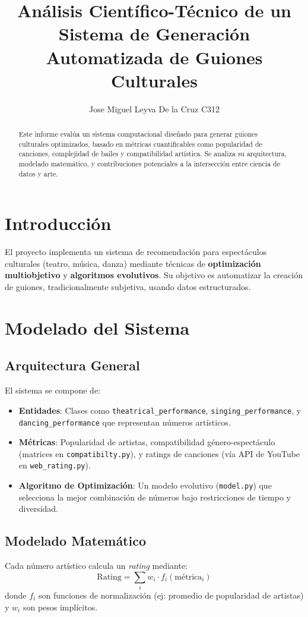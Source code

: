 \documentclass{article}
\title{Análisis Científico-Técnico de un Sistema de Generación Automatizada de Guiones Culturales}
\author{Jose Miguel Leyva De la Cruz C312}
\date{}
\begin{document}
\maketitle

\begin{abstract}
Este informe evalúa un sistema computacional diseñado para generar guiones culturales optimizados, basado en métricas cuantificables como popularidad de canciones, complejidad de bailes y compatibilidad artística. Se analiza su arquitectura, modelado matemático, y contribuciones potenciales a la intersección entre ciencia de datos y arte.
\end{abstract}

\section{Introducción}
El proyecto implementa un sistema de recomendación para espectáculos culturales (teatro, música, danza) mediante técnicas de \textbf{optimización multiobjetivo} y \textbf{algoritmos evolutivos}. Su objetivo es automatizar la creación de guiones, tradicionalmente subjetiva, usando datos estructurados.

\section{Modelado del Sistema}

\subsection{Arquitectura General}
El sistema se compone de:
\begin{itemize}
    \item \textbf{Entidades}: Clases como \texttt{theatrical\_performance}, \texttt{singing\_performance}, y \texttt{dancing\_performance} que representan números artísticos.
    \item \textbf{Métricas}: Popularidad de artistas, compatibilidad género-espectáculo (matrices en \texttt{compatibilty.py}), y ratings de canciones (vía API de YouTube en \texttt{web\_rating.py}).
    \item \textbf{Algoritmo de Optimización}: Un modelo evolutivo (\texttt{model.py}) que selecciona la mejor combinación de números bajo restricciones de tiempo y diversidad.
\end{itemize}

\subsection{Modelado Matemático}
Cada número artístico calcula un \textit{rating} mediante:
\[
\text{Rating} = \sum_{i} w_i \cdot f_i(\text{métrica}_i)
\]
donde \( f_i \) son funciones de normalización (ej: promedio de popularidad de artistas) y \( w_i \) son pesos implícitos.
\end{document}
